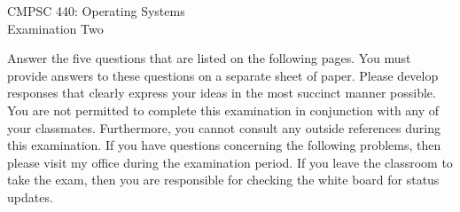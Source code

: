 \documentclass[12pt,epsf,psfig,graphics]{article}
\def\widow#1{\vskip #1\vbadness10000\penalty-200\vskip-#1}
\begin{document}

\def\widow#1{\vskip #1\vbadness10000\penalty-200\vskip-#1}

\begin{center}

CMPSC 440: Operating Systems\\
Examination Two\\

\end{center}

\noindent
Answer the five questions that are listed on the following pages.  You must provide answers to these questions on a
separate sheet of paper.  Please develop responses that clearly express your ideas in the most succinct manner possible.
You are not permitted to complete this examination in conjunction with any of your classmates.  Furthermore, you cannot
consult any outside references during this examination.  If you have questions concerning the following problems, then
please visit my office during the examination period.  If you leave the classroom to take the exam, then you are
responsible for checking the white board for status updates.

\end{document}
